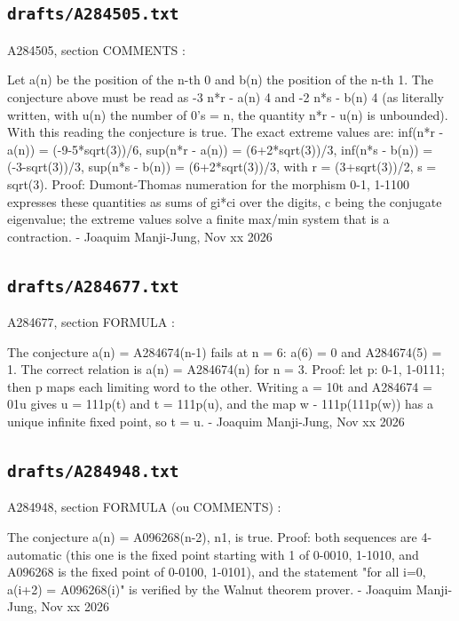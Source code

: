 \subsection*{\texttt{drafts/A284505.txt}}
{\small\raggedright\ttfamily
A284505, section COMMENTS :\par
\par
Let a(n) be the position of the n-th 0 and b(n) the position of the n-th 1. The conjecture above must be read as -3  n*r - a(n)  4 and -2  n*s - b(n)  4 (as literally written, with u(n) the number of 0's = n, the quantity n*r - u(n) is unbounded). With this reading the conjecture is true. The exact extreme values are: inf(n*r - a(n)) = (-9-5*sqrt(3))/6, sup(n*r - a(n)) = (6+2*sqrt(3))/3, inf(n*s - b(n)) = (-3-sqrt(3))/3, sup(n*s - b(n)) = (6+2*sqrt(3))/3, with r = (3+sqrt(3))/2, s = sqrt(3). Proof: Dumont-Thomas numeration for the morphism 0-1, 1-1100 expresses these quantities as sums of gi*ci over the digits, c being the conjugate eigenvalue; the extreme values solve a finite max/min system that is a contraction. - Joaquim Manji-Jung, Nov xx 2026\par
}
\subsection*{\texttt{drafts/A284677.txt}}
{\small\raggedright\ttfamily
A284677, section FORMULA :\par
\par
The conjecture a(n) = A284674(n-1) fails at n = 6: a(6) = 0 and A284674(5) = 1. The correct relation is a(n) = A284674(n) for n = 3. Proof: let p: 0-1, 1-0111; then p maps each limiting word to the other. Writing a = 10t and A284674 = 01u gives u = 111p(t) and t = 111p(u), and the map w - 111p(111p(w)) has a unique infinite fixed point, so t = u. - Joaquim Manji-Jung, Nov xx 2026\par
}
\subsection*{\texttt{drafts/A284948.txt}}
{\small\raggedright\ttfamily
A284948, section FORMULA (ou COMMENTS) :\par
\par
The conjecture a(n) = A096268(n-2), n1, is true. Proof: both sequences are 4-automatic (this one is the fixed point starting with 1 of 0-0010, 1-1010, and A096268 is the fixed point of 0-0100, 1-0101), and the statement "for all i=0, a(i+2) = A096268(i)" is verified by the Walnut theorem prover. - Joaquim Manji-Jung, Nov xx 2026\par
}
